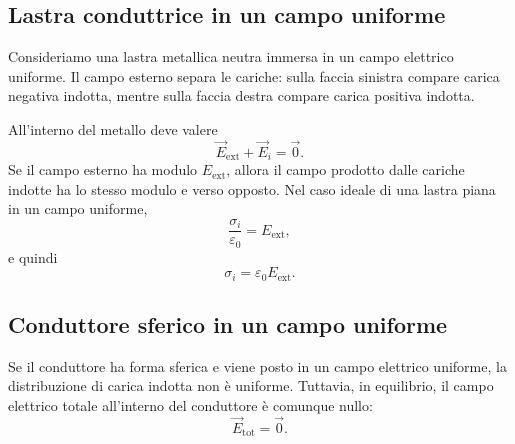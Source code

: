 \documentclass[a4paper]{article}
\begin{document}
\subsection{Lastra conduttrice in un campo uniforme}

Consideriamo una lastra metallica neutra immersa in un campo elettrico uniforme. Il campo esterno separa le cariche: sulla faccia sinistra compare carica negativa indotta, mentre sulla faccia destra compare carica positiva indotta.

\begin{center}
\end{center}

All'interno del metallo deve valere
\[
    \vec{E}_{\mathrm{ext}}+\vec{E}_i=\vec{0}.
\]
Se il campo esterno ha modulo \(E_{\mathrm{ext}}\), allora il campo prodotto dalle cariche indotte ha lo stesso modulo e verso opposto. Nel caso ideale di una lastra piana in un campo uniforme,
\[
    \frac{\sigma_i}{\varepsilon_0}=E_{\mathrm{ext}},
\]
e quindi
\[
    \sigma_i=\varepsilon_0E_{\mathrm{ext}}.
\]

\subsection{Conduttore sferico in un campo uniforme}

Se il conduttore ha forma sferica e viene posto in un campo elettrico uniforme, la distribuzione di carica indotta non è uniforme. Tuttavia, in equilibrio, il campo elettrico totale all'interno del conduttore è comunque nullo:
\[
    \vec{E}_{\mathrm{tot}}=\vec{0}.
\]

\begin{center}
\end{center}
\end{document}

